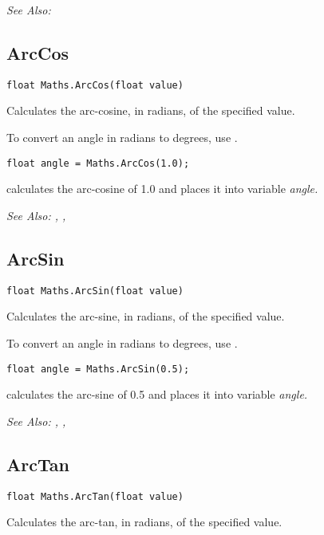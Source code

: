 \it{See Also:} 


\subsection{ArcCos}\label{Maths.ArcCos}%

\begin{verbatim}
float Maths.ArcCos(float value)
\end{verbatim}
Calculates the arc-cosine, in radians, of the specified value.

To convert an angle in radians to degrees, use .

\begin{verbatim}
float angle = Maths.ArcCos(1.0);
\end{verbatim}
calculates the arc-cosine of 1.0 and places it into variable \it{angle}.

\it{See Also:} ,
,


\subsection{ArcSin}\label{Maths.ArcSin}%

\begin{verbatim}
float Maths.ArcSin(float value)
\end{verbatim}
Calculates the arc-sine, in radians, of the specified value.

To convert an angle in radians to degrees, use .

\begin{verbatim}
float angle = Maths.ArcSin(0.5);
\end{verbatim}
calculates the arc-sine of 0.5 and places it into variable \it{angle}.

\it{See Also:} ,
,


\subsection{ArcTan}\label{Maths.ArcTan}%

\begin{verbatim}
float Maths.ArcTan(float value)
\end{verbatim}
Calculates the arc-tan, in radians, of the specified value.

